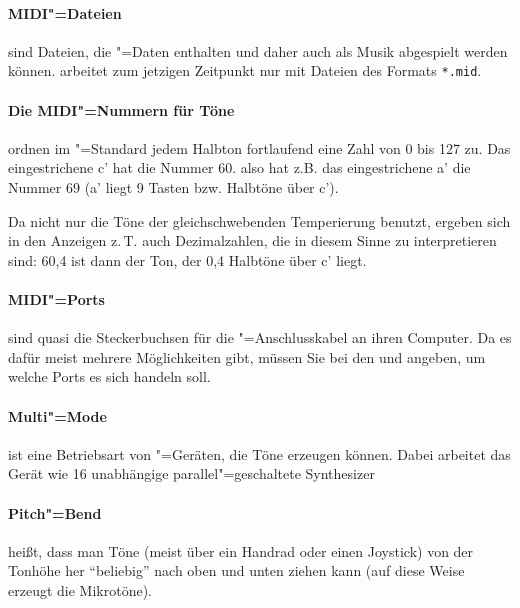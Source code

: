 {\paragraph{MIDI"=Dateien}\label{sec:DV_MIDIFILE} sind Dateien,
  die "=Daten enthalten und daher auch als
  Musik abgespielt werden können. \mutabor{} arbeitet zum jetzigen
  Zeitpunkt nur mit Dateien des Formats \texttt{*.mid}.

\paragraph{Die MIDI"=Nummern für Töne}\label{sec:DV_MIDINOTES}
  ordnen im "=Standard jedem Halbton
  fortlaufend eine Zahl von 0 bis 127 zu. Das eingestrichene c' hat
  die Nummer 60. also hat z.B. das eingestrichene a' die Nummer 69 (a'
  liegt 9 Tasten bzw. Halbtöne über c').

  Da \mutabor{} nicht nur die Töne der gleichschwebenden Temperierung
  benutzt, ergeben sich in den Anzeigen z.\,T. auch Dezimalzahlen, die
  in diesem Sinne zu interpretieren sind: 60,4 ist dann der Ton, der
  0,4 Halbtöne über c' liegt.

\paragraph{MIDI"=Ports}\label{sec:DV_PORT} sind quasi die
  Steckerbuchsen für die "=Anschlusskabel an
  ihren Computer. Da es dafür meist mehrere Möglichkeiten gibt, müssen
  Sie bei den  und
   angeben, um welche Ports es sich
  handeln soll.

\paragraph{Multi"=Mode}\label{sec:DV_MULTI} ist eine
  Betriebsart von "=Geräten, die Töne
  erzeugen können. Dabei arbeitet das Gerät wie 16 unabhängige
  parallel"=geschaltete Synthesizer

\paragraph{Pitch"=Bend}\label{sec:DV_PITCH} heißt, dass man Töne
  (meist über ein Handrad oder einen Joystick) von der Tonhöhe her
  "`beliebig"' nach oben und unten ziehen kann (auf diese Weise
  erzeugt \mutabor{} die Mikrotöne).

}
